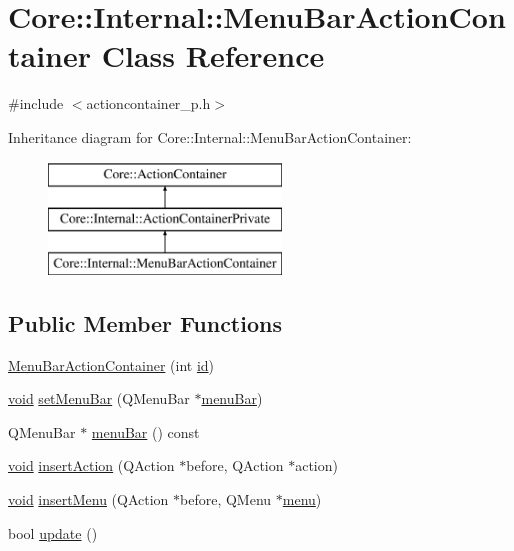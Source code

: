\hypertarget{class_core_1_1_internal_1_1_menu_bar_action_container}{\section{\-Core\-:\-:\-Internal\-:\-:\-Menu\-Bar\-Action\-Container \-Class \-Reference}
\label{class_core_1_1_internal_1_1_menu_bar_action_container}
}


{\ttfamily \#include $<$actioncontainer\-\_\-p.\-h$>$}

\-Inheritance diagram for \-Core\-:\-:\-Internal\-:\-:\-Menu\-Bar\-Action\-Container\-:\begin{figure}[H]
\begin{center}
\leavevmode
\includegraphics[height=3.000000cm]{class_core_1_1_internal_1_1_menu_bar_action_container}
\end{center}
\end{figure}
\subsection*{\-Public \-Member \-Functions}
\begin{DoxyCompactItemize}
\item 
\hyperlink{group___core_plugin_gaaeb681e958e32ea22b8d3084b82893c1}{\-Menu\-Bar\-Action\-Container} (int \hyperlink{group___core_plugin_ga394d3161befa5e1f84cf07253b21a536}{id})
\item 
\hyperlink{group___u_a_v_objects_plugin_ga444cf2ff3f0ecbe028adce838d373f5c}{void} \hyperlink{group___core_plugin_gad4a4ad468602effcfce96602e185f05f}{set\-Menu\-Bar} (\-Q\-Menu\-Bar $\ast$\hyperlink{group___core_plugin_ga0094d37ac9d9bf59377cb35eeb50bfdc}{menu\-Bar})
\item 
\-Q\-Menu\-Bar $\ast$ \hyperlink{group___core_plugin_ga0094d37ac9d9bf59377cb35eeb50bfdc}{menu\-Bar} () const 
\item 
\hyperlink{group___u_a_v_objects_plugin_ga444cf2ff3f0ecbe028adce838d373f5c}{void} \hyperlink{group___core_plugin_ga056bc739ab6fc888ce8e818634053af2}{insert\-Action} (\-Q\-Action $\ast$before, \-Q\-Action $\ast$action)
\item 
\hyperlink{group___u_a_v_objects_plugin_ga444cf2ff3f0ecbe028adce838d373f5c}{void} \hyperlink{group___core_plugin_ga5f4d2b69fca4e96729a1657635c8ae6b}{insert\-Menu} (\-Q\-Action $\ast$before, \-Q\-Menu $\ast$\hyperlink{group___core_plugin_ga243949a2b2abff30862e34f6313f28c0}{menu})
\item 
bool \hyperlink{group___core_plugin_gac057c6626ec37e993a4157e8712f1a46}{update} ()
\end{DoxyCompactItemize}
